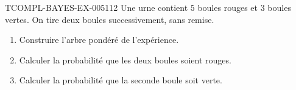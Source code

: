 \begin{exercice}{TCOMPL-BAYES-EX-005}{1}{12}
Une urne contient $5$ boules rouges et $3$ boules vertes. On tire deux boules
successivement, sans remise.
\begin{enumerate}
  \item Construire l'arbre pondéré de l'expérience.
  \item Calculer la probabilité que les deux boules soient rouges.
  \item Calculer la probabilité que la seconde boule soit verte.
\end{enumerate}
\end{exercice}
